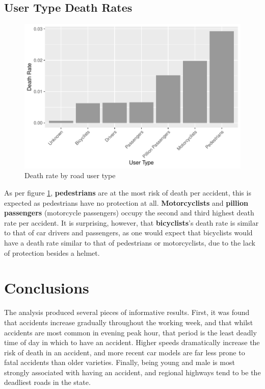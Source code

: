 \documentclass[11pt,a4paper,]{article}
\begin{document}
\subsection*{User Type Death Rates}

\begin{figure}
\centering
\includegraphics{Report_files/figure-latex/user-death-rate-1.pdf}
\caption{\label{fig:user-death-rate}Death rate by road user type}
\end{figure}

As per figure \ref{fig:user-death-rate}, \textbf{pedestrians} are at the most risk of death per accident, this is expected as pedestrians have no protection at all. \textbf{Motorcyclists} and \textbf{pillion passengers} (motorcycle passengers) occupy the second and third highest death rate per accident. It is surprising, however, that \textbf{bicyclists}'s death rate is similar to that of car drivers and passengers, as one would expect that bicyclists would have a death rate similar to that of pedestrians or motorcyclists, due to the lack of protection besides a helmet.

\section*{Conclusions}

The analysis produced several pieces of informative results. First, it was found that accidents increase gradually throughout the working week, and that whilst accidents are most common in evening peak hour, that period is the least deadly time of day in which to have an accident. Higher speeds dramatically increase the risk of death in an accident, and more recent car models are far less prone to fatal accidents than older varieties. Finally, being young and male is most strongly associated with having an accident, and regional highways tend to be the deadliest roads in the state.
\end{document}
